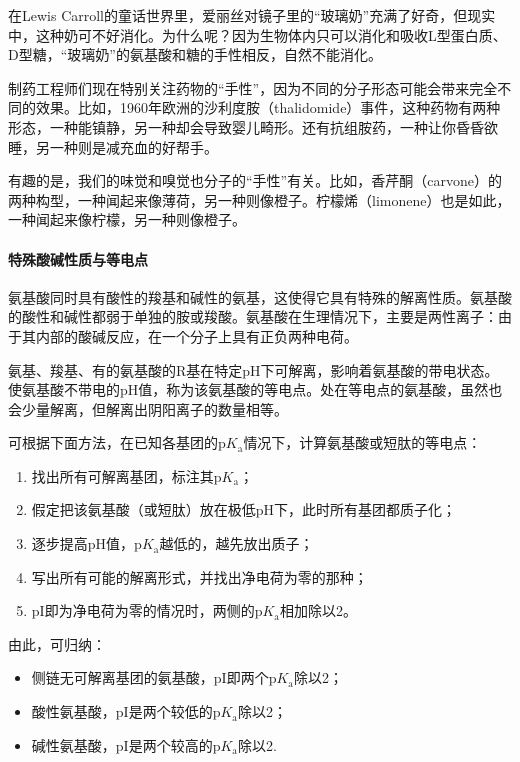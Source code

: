 \begin{gs}[:手性]
	\hspace{2em}在Lewis Carroll的童话世界里，爱丽丝对镜子里的“玻璃奶”充满了好奇，但现实中，这种奶可不好消化。为什么呢？因为生物体内只可以消化和吸收L型蛋白质、D型糖，“玻璃奶”的氨基酸和糖的手性相反，自然不能消化。

	\hspace{2em}制药工程师们现在特别关注药物的“手性”，因为不同的分子形态可能会带来完全不同的效果。比如，1960年欧洲的沙利度胺（thalidomide）事件，这种药物有两种形态，一种能镇静，另一种却会导致婴儿畸形。还有抗组胺药，一种让你昏昏欲睡，另一种则是减充血的好帮手。

	\hspace{2em}有趣的是，我们的味觉和嗅觉也分子的“手性”有关。比如，香芹酮（carvone）的两种构型，一种闻起来像薄荷，另一种则像橙子。柠檬烯（limonene）也是如此，一种闻起来像柠檬，另一种则像橙子。
\end{gs}

\paragraph{特殊酸碱性质与等电点}

氨基酸同时具有酸性的羧基和碱性的氨基，这使得它具有特殊的解离性质。氨基酸的酸性和碱性都弱于单独的胺或羧酸。氨基酸在生理情况下，主要是两性离子：由于其内部的酸碱反应，在一个分子上具有正负两种电荷。

氨基、羧基、有的氨基酸的R基在特定pH下可解离，影响着氨基酸的带电状态。使氨基酸不带电的pH值，称为该氨基酸的等电点。处在等电点的氨基酸，虽然也会少量解离，但解离出阴阳离子的数量相等。

可根据下面方法，在已知各基团的$\mathrm{p}K_{\text{a}}$情况下，计算氨基酸或短肽的等电点：
\begin{enumerate}
	\item 找出所有可解离基团，标注其$\mathrm{p}K_{\text{a}}$；
	\item 假定把该氨基酸（或短肽）放在极低pH下，此时所有基团都质子化；
	\item 逐步提高pH值，$\mathrm{p}K_{\text{a}}$越低的，越先放出质子；
	\item 写出所有可能的解离形式，并找出净电荷为零的那种；
	\item pI即为净电荷为零的情况时，两侧的$\mathrm{p}K_{\text{a}}$相加除以2。
\end{enumerate}

由此，可归纳：
\begin{itemize}
	\item 侧链无可解离基团的氨基酸，pI即两个$\mathrm{p}K_{\text{a}}$除以2；
	\item 酸性氨基酸，pI是两个较低的$\mathrm{p}K_{\text{a}}$除以2；
	\item 碱性氨基酸，pI是两个较高的$\mathrm{p}K_{\text{a}}$除以2.
\end{itemize}

